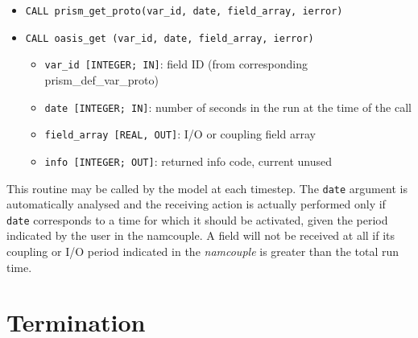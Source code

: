 \begin{itemize} 

\item {\tt CALL prism\_get\_proto(var\_id, date, field\_array, ierror)}
\item {\tt CALL oasis\_get       (var\_id, date, field\_array, ierror)}
\begin{itemize}
\item {\tt var\_id [INTEGER; IN]}: field ID (from
  corresponding prism\_def\_var\_proto)
\item {\tt date [INTEGER; IN]}: number of seconds in the run at the
time of the call
\item {\tt field\_array [REAL, OUT]}: I/O or coupling field array 
\item {\tt info [INTEGER; OUT]}: returned info code, current unused
\end{itemize}
\end{itemize}

This routine may be called by the model at each timestep. The {\tt date}
argument is automatically analysed and the receiving action is actually
performed only if {\tt date} corresponds to a time for which it should
be activated, given the period indicated by the user in the
namcouple. A field will not be received at all if its
coupling or I/O period indicated in the {\it namcouple} is greater
than the total run time.

\section{Termination}
\label{subsubsec_Termination}

